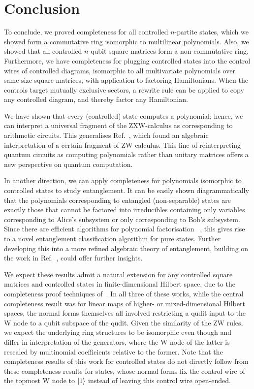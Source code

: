 \section{Conclusion}
To conclude, we proved completeness for all controlled $n$-partite states, which we showed form a commutative ring isomorphic to multilinear polynomials. Also, we showed that all controlled $n$-qubit square matrices form a non-commutative ring. Furthermore, we have completeness for plugging controlled states into the control wires of controlled diagrams, isomorphic to all multivariate polynomials over same-size square matrices, with application to factoring Hamiltonians. When the controls target mutually exclusive sectors, a rewrite rule can be applied to copy any controlled diagram, and thereby factor any Hamiltonian.

We have shown that every (controlled) state computes a polynomial; hence, we can interpret a universal fragment of the ZXW-calculus as corresponding to arithmetic circuits. This generalises Ref.~\cite{carette2023compositionality}, which found an algebraic interpretation of a certain fragment of ZW calculus.
This line of reinterpreting quantum circuits as computing polynomials rather than unitary matrices offers a new perspective on quantum computation.

In another direction, we can apply completeness for polynomials isomorphic to controlled states to study entanglement. It can be easily shown diagrammatically that the polynomials corresponding to entangled (non-separable) states are exactly those that cannot be factored into irreducibles containing only variables corresponding to Alice's subsystem or only corresponding to Bob's subsystem. Since there are efficient algorithms for polynomial factorisation ~\cite{forbes2015complexity}, this gives rise to a novel entanglement classification algorithm for pure states. Further developing this into a more refined algebraic theory of entanglement, building on the work in Ref.~\cite{Agnew2023Masters}, could offer further insights.

We expect these results admit a natural extension for any controlled square matrices and controlled states in finite-dimensional Hilbert space, due to the completeness proof techniques of~\cite{poor2023completeness,deVisme2025minzw, Poor2025ZXFD}.
In all three of these works, while the central completeness result was for linear maps of higher- or mixed-dimensional Hilbert spaces, the normal forms themselves all involved restricting a qudit input to the W node to a qubit subspace of the qudit. Given the similarity of the ZW rules, we expect the underlying ring structures to be isomorphic even though \cite{poor2023completeness,Poor2025ZXFD} and~\cite{deVisme2025minzw} differ in interpretation of the generators, where the W node of the latter is rescaled by multinomial coefficients relative to the former.
Note that the completeness results of this work for controlled states do not directly follow from these completeness results for states, whose normal forms fix the control wire of the topmost W node to $\ket{1}$ instead of leaving this control wire open-ended.

